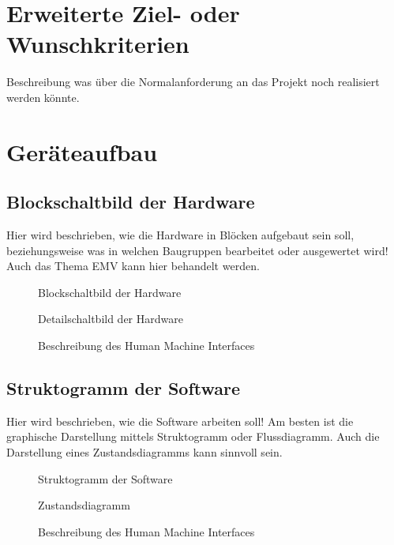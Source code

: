 \documentclass[12pt]{article}
\begin{document}
\section{Erweiterte Ziel- oder Wunschkriterien}
Beschreibung was über die Normalanforderung an das Projekt noch realisiert werden könnte.

\section{Geräteaufbau}
\subsection{Blockschaltbild der Hardware}
Hier wird beschrieben, wie die Hardware in Blöcken aufgebaut sein soll, beziehungsweise was in welchen Baugruppen bearbeitet oder ausgewertet wird! \\
Auch das Thema EMV kann hier behandelt werden.
\begin{figure}[h]
    \centering
    \caption{Blockschaltbild der Hardware}
\end{figure}
\begin{figure}[h]
    \centering
    \caption{Detailschaltbild der Hardware}
\end{figure}
\begin{figure}[h]
    \centering
    \caption{Beschreibung des Human Machine Interfaces}
\end{figure}
\clearpage

\subsection{Struktogramm der Software}
Hier wird beschrieben, wie die Software arbeiten soll!
Am besten ist die graphische Darstellung mittels Struktogramm oder Flussdiagramm.
Auch die Darstellung eines Zustandsdiagramms kann sinnvoll sein.
\begin{figure}[h]
    \centering
    \caption{Struktogramm der Software}
\end{figure}
\begin{figure}[h]
    \centering
    \caption{Zustandsdiagramm}
\end{figure}
\begin{figure}[h]
    \centering
    \caption{Beschreibung des Human Machine Interfaces}
\end{figure}
\clearpage
\end{document}
